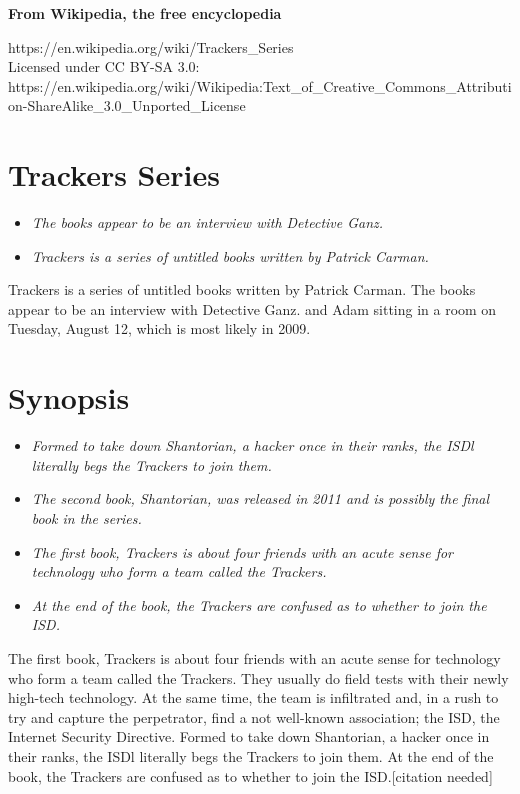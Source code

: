 \textbf{From Wikipedia, the free encyclopedia}

https://en.wikipedia.org/wiki/Trackers\_Series\\
Licensed under CC BY-SA 3.0:\\
https://en.wikipedia.org/wiki/Wikipedia:Text\_of\_Creative\_Commons\_Attribution-ShareAlike\_3.0\_Unported\_License

\section{Trackers Series}\label{trackers-series}

\begin{itemize}
\item
  \emph{The books appear to be an interview with Detective Ganz.}
\item
  \emph{Trackers is a series of untitled books written by Patrick
  Carman.}
\end{itemize}

Trackers is a series of untitled books written by Patrick Carman. The
books appear to be an interview with Detective Ganz. and Adam sitting in
a room on Tuesday, August 12, which is most likely in 2009.

\section{Synopsis}\label{synopsis}

\begin{itemize}
\item
  \emph{Formed to take down Shantorian, a hacker once in their ranks,
  the ISDl literally begs the Trackers to join them.}
\item
  \emph{The second book, Shantorian, was released in 2011 and is
  possibly the final book in the series.}
\item
  \emph{The first book, Trackers is about four friends with an acute
  sense for technology who form a team called the Trackers.}
\item
  \emph{At the end of the book, the Trackers are confused as to whether
  to join the ISD.}
\end{itemize}

The first book, Trackers is about four friends with an acute sense for
technology who form a team called the Trackers. They usually do field
tests with their newly high-tech technology. At the same time, the team
is infiltrated and, in a rush to try and capture the perpetrator, find a
not well-known association; the ISD, the Internet Security Directive.
Formed to take down Shantorian, a hacker once in their ranks, the ISDl
literally begs the Trackers to join them. At the end of the book, the
Trackers are confused as to whether to join the ISD.{[}citation
needed{]}

